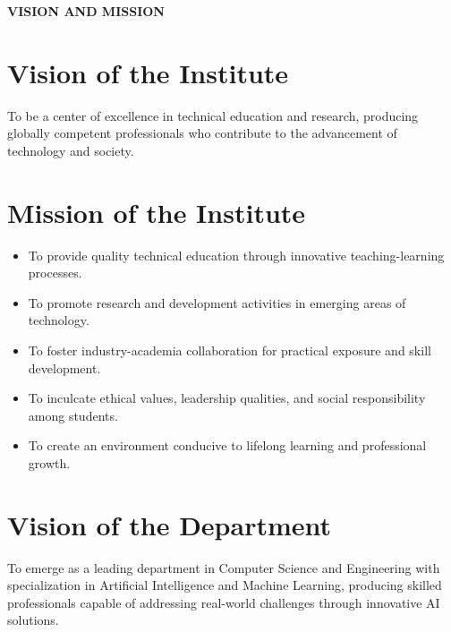 \newpage
\thispagestyle{empty}
\begin{center}
\textbf{\Large VISION AND MISSION}
\end{center}

\vspace{1cm}

\section*{Vision of the Institute}
To be a center of excellence in technical education and research, producing globally competent professionals who contribute to the advancement of technology and society.

\vspace{1cm}

\section*{Mission of the Institute}
\begin{itemize}
    \item To provide quality technical education through innovative teaching-learning processes.
    \item To promote research and development activities in emerging areas of technology.
    \item To foster industry-academia collaboration for practical exposure and skill development.
    \item To inculcate ethical values, leadership qualities, and social responsibility among students.
    \item To create an environment conducive to lifelong learning and professional growth.
\end{itemize}

\vspace{1cm}

\section*{Vision of the Department}
To emerge as a leading department in Computer Science and Engineering with specialization in Artificial Intelligence and Machine Learning, producing skilled professionals capable of addressing real-world challenges through innovative AI solutions.

\vspace{1cm}

